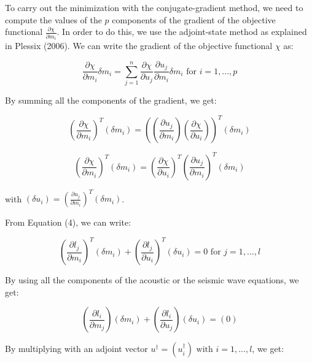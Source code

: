 \documentclass{article}
\begin{document}
To carry out the minimization with the conjugate-gradient method, we need to compute the values of the $p$ components of the gradient of the objective functional $\frac{\partial \chi}{\partial m_i}$. In order to do this, we use the adjoint-state method as explained in Plessix (2006). We can write the gradient of the objective functional $\chi$ as:

\begin{equation}
	\frac{\partial \chi}{\partial m_i} \delta m_i = \sum_{j = 1}^{n} \frac{\partial \chi}{\partial u_j} \frac{\partial u_j}{\partial m_i} \delta m_i \text{ for } i = 1, ... , p
\end{equation}

By summing all the components of the gradient, we get:

\begin{equation}
	\left( \frac{\partial \chi}{\partial m_i} \right) ^{T} \left( \delta m_i \right) = \left( \left( \frac{\partial u_j}{\partial m_i} \right) \left( \frac{\partial \chi}{\partial u_i} \right) \right) ^{T} \left( \delta m_i \right)
\end{equation}

\begin{equation}
	\left( \frac{\partial \chi}{\partial m_i} \right) ^{T} \left( \delta m_i \right) = \left( \frac{\partial \chi}{\partial u_i} \right) ^{T} \left( \frac{\partial u_j}{\partial m_i} \right) ^{T} \left( \delta m_i \right)
\end{equation}

with $\left( \delta u_i \right) = \left( \frac{\partial u_j}{\partial m_i} \right) ^{T} \left( \delta m_i \right)$.

From Equation (4), we can write:

\begin{equation}
	\left( \frac{\partial l_j}{\partial m_i} \right) ^{T} \left( \delta m_i \right) + \left( \frac{\partial l_j}{\partial u_i} \right) ^{T} \left( \delta u_i \right) = 0 \text{ for } j = 1, ... , l
\end{equation}

By using all the components of the acoustic or the seismic wave equations, we get:

\begin{equation}
	\left( \frac{\partial l_i}{\partial m_j} \right) \left( \delta m_i \right) + \left( \frac{\partial l_i}{\partial u_j} \right) \left( \delta u_i \right) = \left( 0 \right)
\end{equation}

By multiplying with an adjoint vector $u^{\dagger} = (u_i^{\dagger}) \text{ with } i = 1, ... , l$, we get:
\end{document}
